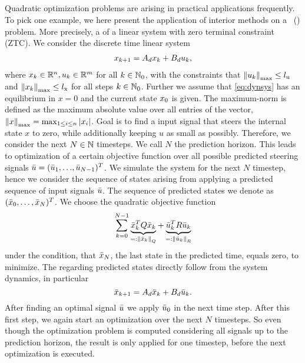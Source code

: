 \subsection{\mpclong}
Quadratic optimization problems are arising in practical applications frequently. To pick one example, we here present the application of interior methods on a \mpclong \ (\mpc) problem. More precisely, a \mpc of a linear system with zero terminal constraint (ZTC).
We consider the discrete time linear system
\begin{align}
	x_{k+1} = A_d x_k + B_d u_k, \label{eq:dynsys}
\end{align}
where $ x_k \in \mathbb{R}^n, u_k \in \mathbb{R}^m $ for all $ k \in  \mathbb{N}_0$, with the constraints that $ {\left\lVert u_k\right\rVert}_{\mathrm{max}} \leq {l}_{\mathrm{u}}$
and $ {\left\lVert x_k\right\rVert}_{\mathrm{max}} \leq {l}_{\mathrm{x}} $ for all steps $ k\in \mathbb{N}_0 $. Further we assume that \eqref{eq:dynsys} has an equilibrium in $ x = 0 $ and the current state $ x_0 $ is given. The maximum-norm is defined as the maximum absolute value over all entries of the vector, ${\left\lVert x\right\rVert}_{\mathrm{max}} = \max_{1\leq i\leq n } |x_i| $.
Goal is to find a input signal that steers the internal state $ x $ to zero, while additionally keeping $ u $ as small as possibly. Therefore, we consider the next $ N \in \mathbb{N} $ timesteps. We call $ N $ the prediction horizon.
This leads to optimization of a certain objective function over all possible predicted steering signals $ \bar{u} = ({\bar{u}_1},{\dots},{\bar{u}_{N-1}})^T $. We simulate the system for the next $ N $ timestep, hence we consider the sequence of states arising from applying a predicted sequence of input signals $ \bar{u} $. The sequence of predicted states we denote as $ (\bar{x}_0,\dots,\bar{x}_N)^T $.
We choose the quadratic objective function
\begin{equation}
	\sum_{k = 0}^{N-1} \underbrace{\bar{x}_k^T Q \bar{x}_k }_{=: \left\lVert\bar{x}_k\right\rVert_Q}+ \underbrace{\bar{u}_k ^T R \bar{u}_k}_{=:\left\lVert\bar{u}_k\right\rVert_R} \label{eq:mpcobjraw}
\end{equation}
 under the condition, that $ \bar{x}_N $, the last state in the predicted time, equals zero,
to minimize. The regarding predicted states directly follow from the system dynamics, in particular
\[ \bar{x}_{k+1} = A_d \bar{x}_k + B_d \bar{u}_k. \] After finding an optimal signal $ \bar{u} $ we apply $ \bar{u}_0 $ in the next time step. After this first step, we again start an optimization over the next $ N $ timesteps. So even though the optimization problem is computed considering all signals up to the prediction horizon, the result is only applied for one timestep, before the next optimization is executed.

